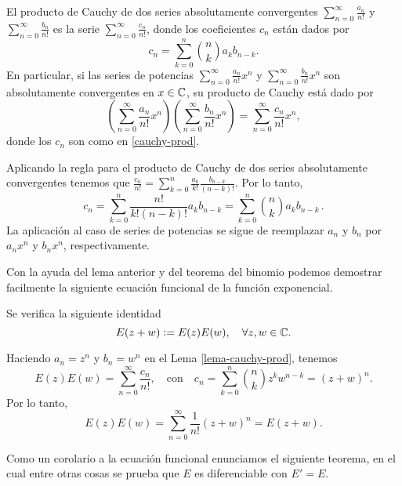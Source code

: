   \begin{lemma} \label{lema-cauchy-prod}
    El producto de Cauchy de dos series absolutamente convergentes $\displaystyle\sum_{n=0}^{\infty} \frac{a_n}{n!}$
    y $\displaystyle\sum_{n=0}^{\infty} \frac{b_n}{n!}$ es la serie $\displaystyle\sum_{n=0}^{\infty} \frac{c_n}{n!}$,
    donde los coeficientes $c_n$ están dados por
    \begin{equation}\label{cauchy-prod}
    \displaystyle c_n = \sum_{k=0}^{n} \binom{n}{k}a_kb_{n-k}.
    \end{equation}
    En particular, si las series de potencias $\displaystyle\sum_{n=0}^{\infty} \frac{a_n}{n!}x^n$ y 
    $\displaystyle\sum_{n=0}^{\infty} \frac{b_n}{n!}x^n$ son absolutamente convergentes en $x\in \mathbb{C}$,
    su producto de Cauchy está dado por
    \begin{equation*}
        \displaystyle \left(\sum_{n=0}^{\infty} \frac{a_n}{n!}x^n \right) \left(\sum_{n=0}^{\infty} \frac{b_n}{n!}x^n\right) = 
        \sum_{n=0}^{\infty} \frac{c_n}{n!}x^n,
    \end{equation*}
    donde los $c_n$ son como en \eqref{cauchy-prod}.
  \end{lemma}
  \begin{dem}
    Aplicando la regla para el producto de Cauchy de dos series absolutamente convergentes tenemos que 
    $\displaystyle \frac{c_n}{n!} = \sum_{k=0}^{n} \frac{a_k}{k!}\frac{b_{n-k}}{(n-k)!}$. Por lo tanto,
    \[
    c_n = \sum_{k=0}^{n} \frac{n!}{k!(n-k)!} a_k b_{n-k} = \sum_{k=0}^{n}\binom{n}{k} a_k b_{n-k} \, .
    \]
    La aplicación al caso de series de potencias se sigue de reemplazar $a_n$ y $b_n$ por $a_nx^n$ y $b_nx^n$,
    respectivamente.
  \end{dem}
  Con la ayuda del lema anterior y del teorema del binomio podemos demostrar facilmente la siguiente ecuación
  funcional de la función exponencial.
  \begin{theo} Se verifica la siguiente identidad
    \begin{equation}
        E(z+w) \vcentcolon = E(z)E(w), \quad \forall z,w \in \mathbb{C}.
    \end{equation}
    \begin{dem}
        Haciendo $a_n = z^n$ y $b_n = w^n$ en el Lema \ref{lema-cauchy-prod}, tenemos
        \[
        E(z)E(w) = \sum_{n=0}^{\infty} \frac{c_n}{n!}, \quad \text{con} \quad 
        c_n = \sum_{k=0}^{n} \binom{n}{k}z^k w^{n-k} = (z+w)^n. 
        \]
        Por lo tanto,
        \[
        E(z)E(w) = \sum_{n=0}^{\infty} \frac{1}{n!}(z+w)^n = E(z+w).
        \]
    \end{dem}
  \end{theo}
Como un corolario a la ecuación funcional enunciamos el siguiente teorema, en el cual entre otras cosas
se prueba que $E$ es diferenciable con $E'= E$. 

